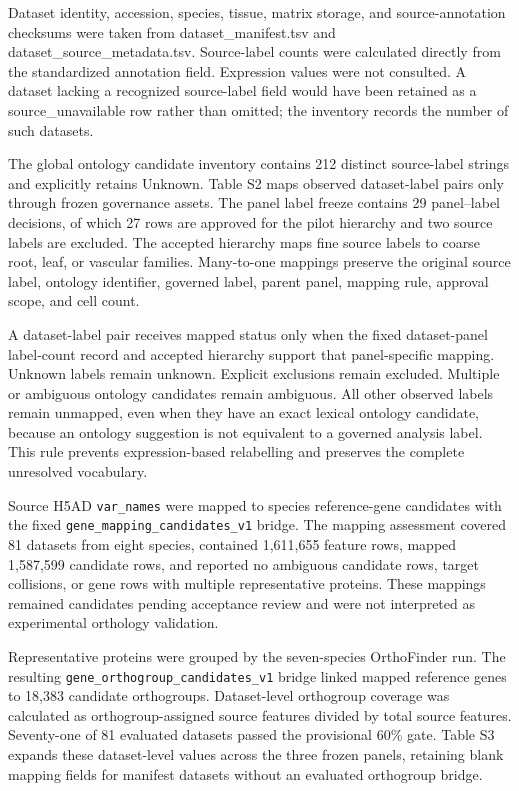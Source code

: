 Dataset identity, accession, species, tissue, matrix storage, and source-annotation checksums were taken from dataset\_manifest.tsv and dataset\_source\_metadata.tsv. Source-label counts were calculated directly from the standardized annotation field. Expression values were not consulted. A dataset lacking a recognized source-label field would have been retained as a source\_unavailable row rather than omitted; the inventory records the number of such datasets.


The global ontology candidate inventory contains 212 distinct source-label strings and explicitly retains Unknown. Table S2 maps observed dataset-label pairs only through frozen governance assets. The panel label freeze contains 29 panel--label decisions, of which 27 rows are approved for the pilot hierarchy and two source labels are excluded. The accepted hierarchy maps fine source labels to coarse root, leaf, or vascular families. Many-to-one mappings preserve the original source label, ontology identifier, governed label, parent panel, mapping rule, approval scope, and cell count.

A dataset-label pair receives mapped status only when the fixed dataset-panel label-count record and accepted hierarchy support that panel-specific mapping. Unknown labels remain unknown. Explicit exclusions remain excluded. Multiple or ambiguous ontology candidates remain ambiguous. All other observed labels remain unmapped, even when they have an exact lexical ontology candidate, because an ontology suggestion is not equivalent to a governed analysis label. This rule prevents expression-based relabelling and preserves the complete unresolved vocabulary.


Source H5AD \texttt{var\_names} were mapped to species reference-gene candidates with the fixed \texttt{gene\_\allowbreak mapping\_\allowbreak candidates\_v1} bridge. The mapping assessment covered 81 datasets from eight species, contained 1,611,655 feature rows, mapped 1,587,599 candidate rows, and reported no ambiguous candidate rows, target collisions, or gene rows with multiple representative proteins. These mappings remained candidates pending acceptance review and were not interpreted as experimental orthology validation.

Representative proteins were grouped by the seven-species OrthoFinder run. The resulting \texttt{gene\_\allowbreak orthogroup\_\allowbreak candidates\_v1} bridge linked mapped reference genes to 18,383 candidate orthogroups. Dataset-level orthogroup coverage was calculated as orthogroup-assigned source features divided by total source features. Seventy-one of 81 evaluated datasets passed the provisional 60\% gate. Table S3 expands these dataset-level values across the three frozen panels, retaining blank mapping fields for manifest datasets without an evaluated orthogroup bridge.

